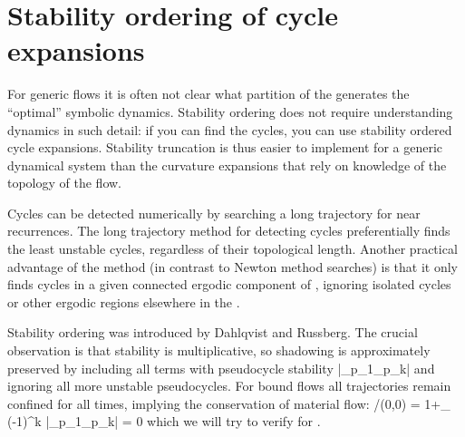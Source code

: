 \renewcommand{\inputfile}{\version\ - edited 2008-06-26 stabOrder}



\section{Stability ordering of cycle expansions}

For generic flows it is often not clear what
partition of the {\statesp} generates the ``optimal''
symbolic dynamics.  Stability ordering
does not require understanding dynamics in such detail:
if you can find the cycles, you can use
stability ordered cycle expansions.
Stability truncation
is thus
easier to implement for
a generic dynamical system than the
curvature expansions  that rely on knowledge of the
topology of the flow.

Cycles can be detected numerically by
searching a long trajectory for near recurrences.
The long trajectory method for detecting cycles
preferentially finds
the least unstable cycles, regardless of their topological length.
Another practical advantage of the method (in contrast to
Newton method searches)
is that it only finds
cycles in a given connected ergodic component of {\statesp},
ignoring  isolated cycles or other ergodic regions
elsewhere in the {\statesp}.

Stability ordering was introduced by
Dahlqvist and Russberg. The
crucial observation is that
stability is multiplicative, so shadowing is approximately preserved
by including all terms with pseudocycle stability
\beq
\left|\ExpaEig_{p_1}\cdots\ExpaEig_{p_k}\right| \leq \stabCutoff
{}
and ignoring all more unstable pseudocycles. For bound flows
all trajectories remain confined for
all times, implying the conservation of material flow:
/\zeta(0,0) = 1+\sumprime_\pseudos
		{ (-1)^k \over
		|\ExpaEig_{p_1}\cdots \ExpaEig_{p_k}|} = 0
	\label{prob-cons}
\eeq
which we will try to verify for \KSe.



